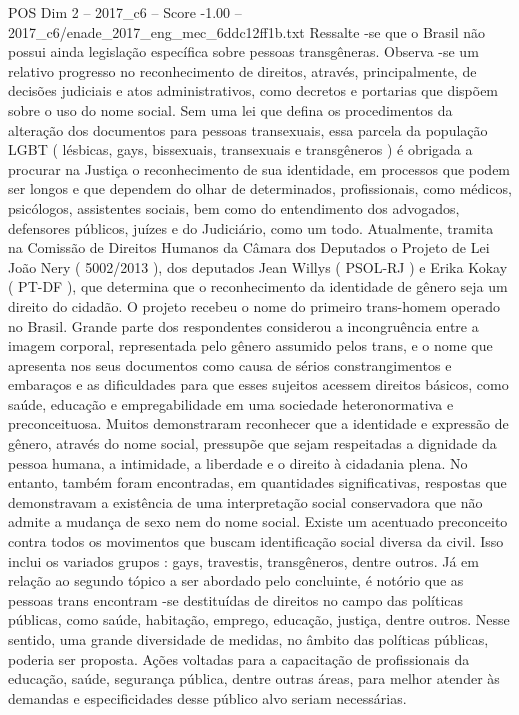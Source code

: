 \begin{textsample}{POS Dim 2 – 2017\_c6 – Score -1.00 – 2017\_c6/enade\_2017\_eng\_mec\_6ddc12ff1b.txt}
Ressalte -se que o Brasil não possui ainda legislação específica sobre pessoas transgêneras.
Observa -se um relativo progresso no reconhecimento de direitos, através, principalmente, de decisões judiciais e atos administrativos, como decretos e portarias que dispõem sobre o uso do nome social.
Sem uma lei que defina os procedimentos da alteração dos documentos para pessoas transexuais, essa parcela da população LGBT ( lésbicas, gays, bissexuais, transexuais e transgêneros ) é obrigada a procurar na Justiça o reconhecimento de sua identidade, em processos que podem ser longos e que dependem do olhar de determinados, profissionais, como médicos, psicólogos, assistentes sociais, bem como do entendimento dos advogados, defensores públicos, juízes e do Judiciário, como um todo.
Atualmente, tramita na Comissão de Direitos Humanos da Câmara dos Deputados o Projeto de Lei João Nery ( 5002/2013 ), dos deputados Jean Willys ( PSOL-RJ ) e Erika Kokay ( PT-DF ), que determina que o reconhecimento da identidade de gênero seja um direito do cidadão.
O projeto recebeu o nome do primeiro trans-homem operado no Brasil.
Grande parte dos respondentes considerou a incongruência entre a imagem corporal, representada pelo gênero assumido pelos trans, e o nome que apresenta nos seus documentos como causa de sérios constrangimentos e embaraços e as dificuldades para que esses sujeitos acessem direitos básicos, como saúde, educação e empregabilidade em uma sociedade heteronormativa e preconceituosa.
Muitos demonstraram reconhecer que a identidade e expressão de gênero, através do nome social, pressupõe que sejam respeitadas a dignidade da pessoa humana, a intimidade, a liberdade e o direito à cidadania plena.
No entanto, também foram encontradas, em quantidades significativas, respostas que demonstravam a existência de uma interpretação social conservadora que não admite a mudança de sexo nem do nome social.
Existe um acentuado preconceito contra todos os movimentos que buscam identificação social diversa da civil.
Isso inclui os variados grupos : gays, travestis, transgêneros, dentre outros.
Já em relação ao segundo tópico a ser abordado pelo concluinte, é notório que as pessoas trans encontram -se destituídas de direitos no campo das políticas públicas, como saúde, habitação, emprego, educação, justiça, dentre outros.
Nesse sentido, uma grande diversidade de medidas, no âmbito das políticas públicas, poderia ser proposta.
Ações voltadas para a capacitação de profissionais da educação, saúde, segurança pública, dentre outras áreas, para melhor atender às demandas e especificidades desse público alvo seriam necessárias.

\end{textsample}
